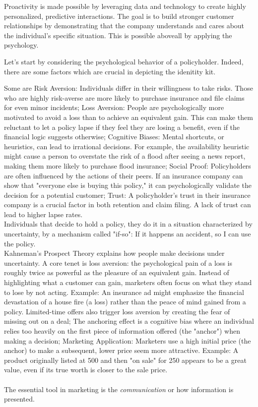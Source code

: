 \documentclass{article}
\begin{document}
Proactivity is made possible by leveraging data and technology to create highly personalized, predictive interactions. The goal is to build stronger customer relationships by demonstrating that the company understands and cares about the individual's specific situation. This is possible aboveall by applying the psychology.


Let's start by considering the psychological behavior of a policyholder. Indeed, there are some factors which are crucial in depicting the idenitity kit.

 Some are Risk Aversion: Individuals differ in their willingness to take risks. Those who are highly risk-averse are more likely to purchase insurance and file claims for even minor incidents; Loss Aversion: People are psychologically more motivated to avoid a loss than to achieve an equivalent gain. This can make them reluctant to let a policy lapse if they feel they are losing a benefit, even if the financial logic suggests otherwise; Cognitive Biases: Mental shortcuts, or heuristics, can lead to irrational decisions. For example, the availability heuristic might cause a person to overstate the risk of a flood after seeing a news report, making them more likely to purchase flood insurance; Social Proof: Policyholders are often influenced by the actions of their peers. If an insurance company can show that "everyone else is buying this policy," it can psychologically validate the decision for a potential customer; Trust: A policyholder's trust in their insurance company is a crucial factor in both retention and claim filing. A lack of trust can lead to higher lapse rates.\\
Individuals that decide to hold a policy, they do it in a situation characterized by uncertainty, by a mechanism called "if-so": If it happens an accident, so I can use the policy.\\
Kahneman's Prospect Theory explains how people make decisions under uncertainty. A core tenet is loss aversion: the psychological pain of a loss is roughly twice as powerful as the pleasure of an equivalent gain. Instead of highlighting what a customer can gain, marketers often focus on what they stand to lose by not acting. Example: An insurance ad might emphasize the financial devastation of a house fire (a loss) rather than the peace of mind gained from a policy. Limited-time offers also trigger loss aversion by creating the fear of missing out on a deal; The anchoring effect is a cognitive bias where an individual relies too heavily on the first piece of information offered (the "anchor") when making a decision; Marketing Application: Marketers use a high initial price (the anchor) to make a subsequent, lower price seem more attractive. Example: A product originally listed at 500 and then "on sale" for 250 appears to be a great value, even if its true worth is closer to the sale price.\\\\
The essential tool in marketing is the \textit{communication} or how information is presented. 
\end{document}
